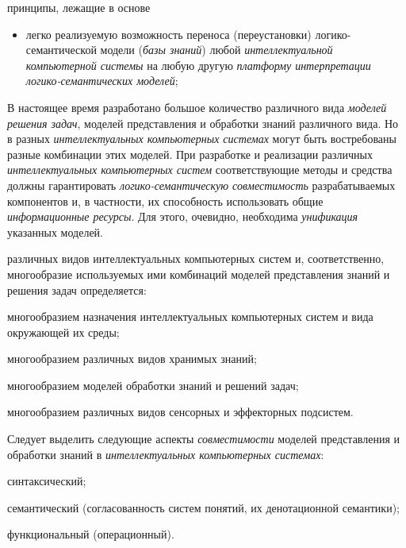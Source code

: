 \begin{SCn}
\begin{scnrelfromlistcustom}{принципы, лежащие в основе}
{\begin{itemize}[labelsep=\tabsize-\bulletsize,leftmargin=\tabsize,label=$\bullet$]
				\item легко реализуемую возможность переноса (переустановки) логико-семантической модели (\textit{базы знаний}) любой \textit{интеллектуальной компьютерной системы} на любую другую \textit{платформу интерпретации логико-семантических моделей};
				\end{itemize}
		}	
		
	\end{scnrelfromlistcustom}
\end{SCn}

В настоящее время разработано большое количество различного вида \textit{моделей решения задач}, моделей представления и обработки знаний различного вида. Но в разных \textit{интеллектуальных компьютерных системах} могут быть востребованы разные комбинации этих моделей. При разработке и реализации различных \textit{интеллектуальных компьютерных систем} соответствующие методы и средства должны гарантировать \textit{логико-семантическую совместимость} разрабатываемых компонентов и, в частности, их способность использовать общие \textit{информационные ресурсы}. Для этого, очевидно, необходима \textit{унификация} указанных моделей.

 различных видов интеллектуальных компьютерных систем и, соответственно, многообразие используемых ими комбинаций моделей представления знаний и решения задач определяется:
\begin{textitemize}
	\item многообразием назначения интеллектуальных компьютерных систем и вида окружающей их среды;
	\item многообразием различных видов хранимых знаний;
	\item многообразием моделей обработки знаний и решений задач;
	\item многообразием различных видов сенсорных и эффекторных подсистем.
\end{textitemize}

Следует выделить следующие аспекты \textit{совместимости} моделей представления и обработки знаний в \textit{интеллектуальных компьютерных системах}:

\begin{textitemize}
	\item синтаксический;
	\item семантический (согласованность систем понятий, их денотационной семантики);
	\item функциональный (операционный).
\end{textitemize}

